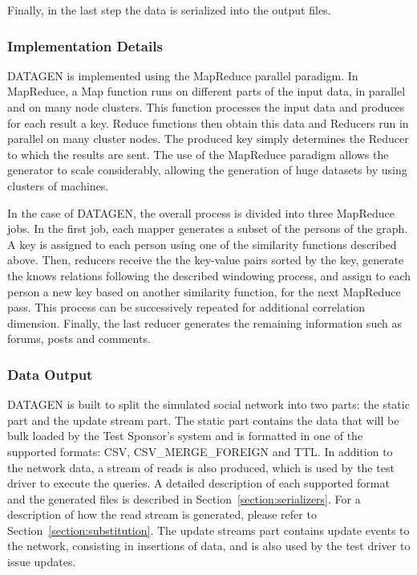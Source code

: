 Finally, in the last step the data is serialized into the output files.

\subsubsection{Implementation Details}

DATAGEN is implemented using the MapReduce parallel paradigm. In MapReduce, a
Map function runs on different parts of the input data, in parallel and on many
node clusters. This function processes the input data and produces for each
result a key. Reduce functions then obtain this data and Reducers run in
parallel on many cluster nodes. The produced key simply determines the Reducer
to which the results are sent. The use of the MapReduce paradigm allows the
generator to scale considerably, allowing the generation of huge datasets by
using clusters of machines.

In the case of DATAGEN, the overall process is divided into three MapReduce jobs.
In the first job, each mapper generates a subset of the persons of the graph. A
key is assigned to each person using one of the similarity functions described
above. Then, reducers receive the the key-value pairs sorted by the key,
generate the knows relations following the described windowing process, and
assign to each person a new key based on another similarity function, for the
next MapReduce pass.  This process can be successively repeated for additional
correlation dimension.  Finally, the last reducer generates the remaining
information such as forums, posts and comments.

\subsubsection{Data Output}

DATAGEN is built to split the simulated social network into two parts: the static
part and the update stream part.  The static part contains the data that will
be bulk loaded by the Test Sponsor's system and  is formatted in one of the
supported formats: CSV, CSV\_MERGE\_FOREIGN and TTL. In addition
to the network data, a stream of reads is also produced, which is used
by the test driver to execute the queries. A detailed description of
each supported format and the generated files is described in
Section~\ref{section:serializers}. For a description of how the read stream is
generated, please refer to Section~\ref{section:substitution}.
The update streams part contains update events to the network, consisting in
insertions of data, and is also used by the test driver to issue updates.

